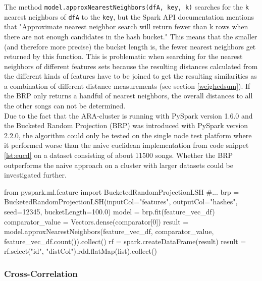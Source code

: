 \noindent The method \lstinline{model.approxNearestNeighbors(dfA, key, k)} searches for the \lstinline{k} nearest neighbors of \lstinline{dfA} to the \lstinline{key}, but the Spark API documentation mentions that "Approximate nearest neighbor search will return fewer than k rows when there are not enough candidates in the hash bucket." \cite{lshspark}
This means that the smaller (and therefore more precise) the bucket length is, the fewer nearest neighbors get returned by this function. This is problematic when searching for the nearest neighbors of different features sets because the resulting distances calculated from the different kinds of features have to be joined to get the resulting similarities as a combination of different distance measurements (see section \ref{weighedsum}). If the BRP only returns a handful of nearest neighbors, the overall distances to all the other songs can not be determined.\\
\noindent Due to the fact that the ARA-cluster is running with PySpark version 1.6.0 and the Bucketed Random Projection (BRP) was introduced with PySpark version 2.2.0, the algorithm could only be tested on the single node test platform where it performed worse than the naive euclidean implementation from code snippet \ref{lst:eucd} on a dataset consisting of about 11500 songs. Whether the BRP outperforms the naive approach on a cluster with larger datasets could be investigated further. 

\begin{pythonCode}[frame=single,label={lst:brp},caption={bucketed random projection},captionpos=b]
from pyspark.ml.feature import BucketedRandomProjectionLSH
#...
brp = BucketedRandomProjectionLSH(inputCol="features", outputCol="hashes", seed=12345, bucketLength=100.0)
model = brp.fit(feature_vec_df)
comparator_value = Vectors.dense(comparator[0])
result = model.approxNearestNeighbors(feature_vec_df, comparator_value, feature_vec_df.count()).collect()
rf = spark.createDataFrame(result)
result = rf.select("id", "distCol").rdd.flatMap(list).collect()
\end{pythonCode}

 

\subsubsection{Cross-Correlation}

